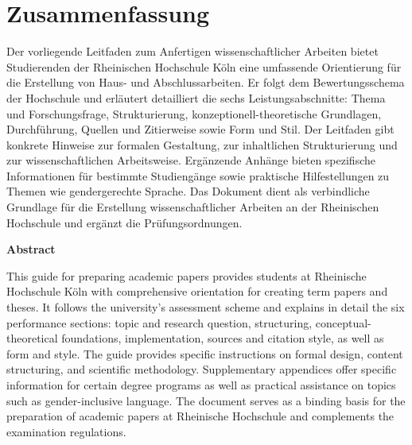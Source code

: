 \chapter*{Zusammenfassung}
\label{sec:zusammenfassung}

Der vorliegende Leitfaden zum Anfertigen wissenschaftlicher Arbeiten bietet Studierenden der Rheinischen Hochschule Köln eine umfassende Orientierung für die Erstellung von Haus- und Abschlussarbeiten. Er folgt dem Bewertungsschema der Hochschule und erläutert detailliert die sechs Leistungsabschnitte: Thema und Forschungsfrage, Strukturierung, konzeptionell-theoretische Grundlagen, Durchführung, Quellen und Zitierweise sowie Form und Stil. Der Leitfaden gibt konkrete Hinweise zur formalen Gestaltung, zur inhaltlichen Strukturierung und zur wissenschaftlichen Arbeitsweise. Ergänzende Anhänge bieten spezifische Informationen für bestimmte Studiengänge sowie praktische Hilfestellungen zu Themen wie gendergerechte Sprache. Das Dokument dient als verbindliche Grundlage für die Erstellung wissenschaftlicher Arbeiten an der Rheinischen Hochschule und ergänzt die Prüfungsordnungen.

\vspace{0.5cm}

\begin{center}
\textbf{Abstract}
\end{center}

This guide for preparing academic papers provides students at Rheinische Hochschule Köln with comprehensive orientation for creating term papers and theses. It follows the university's assessment scheme and explains in detail the six performance sections: topic and research question, structuring, conceptual-theoretical foundations, implementation, sources and citation style, as well as form and style. The guide provides specific instructions on formal design, content structuring, and scientific methodology. Supplementary appendices offer specific information for certain degree programs as well as practical assistance on topics such as gender-inclusive language. The document serves as a binding basis for the preparation of academic papers at Rheinische Hochschule and complements the examination regulations.